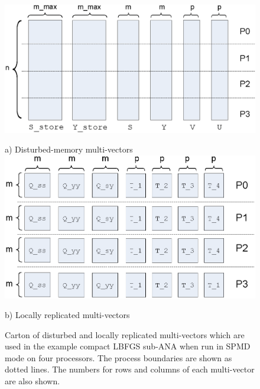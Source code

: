\documentclass[pdf,ps2pdf,11pt]{SANDreport}
\begin{document}
{\bsinglespace
\begin{figure}
\begin{center}

\includegraphics*[angle=0,scale=0.60]{SPMD_Dist_MVs_P4}

a) Disturbed-memory multi-vectors \\[3ex]

\includegraphics*[angle=0,scale=0.60]{SPMD_Locally_Replicated_MVs_P4}

b) Locally replicated multi-vectors

\end{center}
\caption{
\label{tsfcore:fig:SPMD_MVs_P4}
Carton of disturbed and locally replicated multi-vectors which are
used in the example compact LBFGS sub-ANA when run in SPMD mode on
four processors.  The process boundaries are shown as dotted lines.
The numbers for rows and columns of each multi-vector are also shown.}
\end{figure}
\esinglespace}
\end{document}
